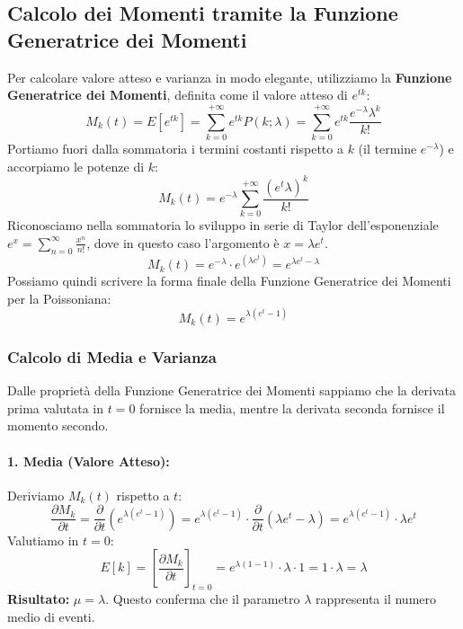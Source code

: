 \documentclass[openany,a4paper,12pt]{book}
\theoremstyle{remark}
\begin{document}
\subsection*{Calcolo dei Momenti tramite la Funzione Generatrice dei Momenti}
Per calcolare valore atteso e varianza in modo elegante, utilizziamo la \textbf{Funzione Generatrice dei Momenti}, definita come il valore atteso di $e^{tk}$:
\[
M_k(t) = E[e^{tk}] = \sum_{k=0}^{+\infty} e^{tk} P(k; \lambda) = \sum_{k=0}^{+\infty} e^{tk} \frac{e^{-\lambda} \lambda^k}{k!}
\]
Portiamo fuori dalla sommatoria i termini costanti rispetto a $k$ (il termine $e^{-\lambda}$) e accorpiamo le potenze di $k$:
\[
M_k(t) = e^{-\lambda} \sum_{k=0}^{+\infty} \frac{(e^t \lambda)^k}{k!}
\]
Riconosciamo nella sommatoria lo sviluppo in serie di Taylor dell'esponenziale $e^x = \sum_{n=0}^{\infty} \frac{x^n}{n!}$, dove in questo caso l'argomento è $x = \lambda e^t$.
\[
M_k(t) = e^{-\lambda} \cdot e^{(\lambda e^t)} = e^{\lambda e^t - \lambda}
\]
Possiamo quindi scrivere la forma finale della Funzione Generatrice dei Momenti per la Poissoniana:
\begin{equation}
\boxed{M_k(t) = e^{\lambda(e^t - 1)}}
\end{equation}



\subsubsection*{Calcolo di Media e Varianza}
Dalle proprietà della Funzione Generatrice dei Momenti sappiamo che la derivata prima valutata in $t=0$ fornisce la media, mentre la derivata seconda fornisce il momento secondo.

\paragraph{1. Media (Valore Atteso):}
Deriviamo $M_k(t)$ rispetto a $t$:
\[
\frac{\partial M_k}{\partial t} = \frac{\partial}{\partial t} \left( e^{\lambda(e^t - 1)} \right) = e^{\lambda(e^t - 1)} \cdot \frac{\partial}{\partial t}(\lambda e^t - \lambda) = e^{\lambda(e^t - 1)} \cdot \lambda e^t
\]
Valutiamo in $t=0$:
\[
E[k] = \left[ \frac{\partial M_k}{\partial t} \right]_{t=0} = e^{\lambda(1-1)} \cdot \lambda \cdot 1 = 1 \cdot \lambda = \lambda
\]
\textbf{Risultato:} $\mu = \lambda$. Questo conferma che il parametro $\lambda$ rappresenta il numero medio di eventi.
\end{document}
